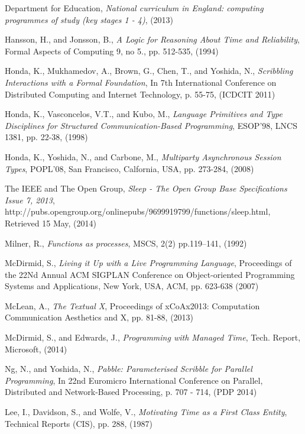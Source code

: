 \documentclass[11pt]{scrartcl}
\begin{document}
\begin{thebibliography}{9}
  Department for Education,
  \emph{National curriculum in England: computing programmes of study (key stages 1 - 4)},
  (2013)

  Hansson, H., and Jonsson, B.,
  \emph{A Logic for Reasoning About Time and Reliability},
  Formal Aspects of Computing 9,
  no 5., pp. 512-535,
  (1994)

  Honda, K., Mukhamedov, A., Brown, G., Chen, T., and Yoshida, N.,
  \emph{Scribbling Interactions with a Formal Foundation},
  In 7th International Conference on Distributed Computing and Internet Technology,
  p. 55-75,
  (ICDCIT 2011)

  Honda, K., Vasconcelos, V.T., and Kubo, M.,
  \emph{Language Primitives and Type Disciplines for Structured Communication-Based Programming},
  ESOP'98, LNCS 1381,
  pp. 22-38,
  (1998)

  Honda, K., Yoshida, N., and Carbone, M.,
  \emph{Multiparty Asynchronous Session Types},
  POPL'08, San Francisco, Calfornia, USA,
  pp. 273-284,
  (2008)

  The IEEE and The Open Group,
  \emph{Sleep - The Open Group Base Specifications Issue 7, 2013},
  http://pubs.opengroup.org/onlinepubs/9699919799/functions/sleep.html,
  Retrieved 15 May,
  (2014)

   Milner, R.,
   \emph{Functions as processes},
   MSCS, 2(2) pp.119–141,
   (1992)

  McDirmid, S.,
  \emph{Living it Up with a Live Programming Language},
  Proceedings of the 22Nd Annual ACM SIGPLAN Conference on Object-oriented Programming Systems and Applications,
  New York, USA,
  ACM, pp. 623-638
  (2007)

  McLean, A.,
  \emph{The Textual X},
  Proceedings of xCoAx2013: Computation Communication Aesthetics and X,
  pp. 81-88,
  (2013)

  McDirmid, S., and Edwards, J.,
  \emph{Programming with Managed Time},
  Tech. Report, Microsoft,
  (2014)

  Ng, N., and Yoshida, N.,
  \emph{Pabble: Parameterised Scribble for Parallel Programming},
  In 22nd Euromicro International Conference on Parallel, Distributed and Network-Based Processing, 
  p. 707 - 714,
  (PDP 2014)

  Lee, I., Davidson, S., and Wolfe, V.,
  \emph{Motivating Time as a First Class Entity},
  Technical Reports (CIS),
  pp. 288,
  (1987)


\end{thebibliography}
\end{document}
